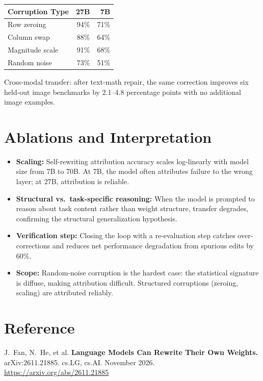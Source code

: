 \documentclass[10pt,twocolumn]{article}
\begin{document}
\begin{center}
\small
\begin{tabular}{lrr}
\toprule
\textbf{Corruption Type} & \textbf{27B} & \textbf{7B} \\
\midrule
Row zeroing & 94\% & 71\% \\
Column swap & 88\% & 64\% \\
Magnitude scale & 91\% & 68\% \\
Random noise & 73\% & 51\% \\
\bottomrule
\end{tabular}
\end{center}

Cross-modal transfer: after text-math repair, the same correction improves six held-out image benchmarks by 2.1--4.8 percentage points with no additional image examples.

\section{Ablations and Interpretation}

\begin{itemize}[leftmargin=1em,itemsep=2pt]
  \item \textbf{Scaling:} Self-rewriting attribution accuracy scales log-linearly with model size from 7B to 70B.
    At 7B, the model often attributes failure to the wrong layer; at 27B, attribution is reliable.
  \item \textbf{Structural vs.\ task-specific reasoning:} When the model is prompted to reason about task content rather than weight structure, transfer degrades, confirming the structural generalization hypothesis.
  \item \textbf{Verification step:} Closing the loop with a re-evaluation step catches over-corrections and reduces net performance degradation from spurious edits by 60\%.
  \item \textbf{Scope:} Random-noise corruption is the hardest case: the statistical signature is diffuse, making attribution difficult. Structured corruptions (zeroing, scaling) are attributed reliably.
\end{itemize}

\section*{Reference}
J.\ Fan, N.\ He, et al.
\textbf{Language Models Can Rewrite Their Own Weights.}
arXiv:2611.21885. cs.LG, cs.AI. November 2026.
\url{https://arxiv.org/abs/2611.21885}
\end{document}
